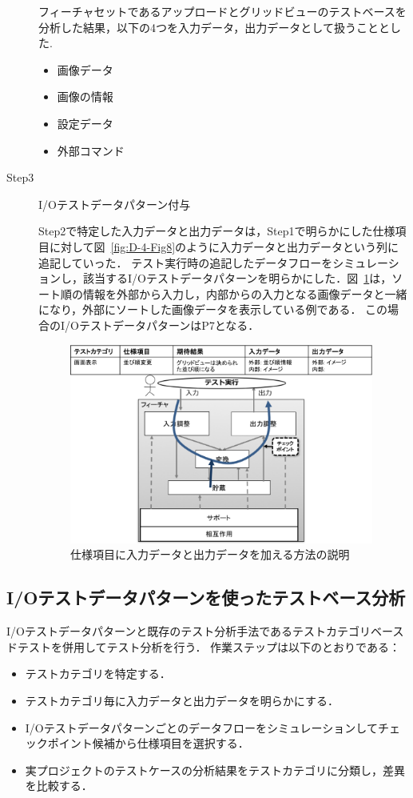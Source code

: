 \begin{description}
フィーチャセットであるアップロードとグリッドビューのテストベースを分析した結果，以下の4つを入力データ，出力データとして扱うこととした.
\begin{itemize}
 \item 画像データ
 \item 画像の情報
 \item 設定データ
　\item 外部コマンド
\end{itemize}

\item[Step3] I/Oテストデータパターン付与

Step2で特定した入力データと出力データは，Step1で明らかにした仕様項目に対して図~\ref{fig:D-4-Fig8}のように入力データと出力データという列に追記していった．
テスト実行時の追記したデータフローをシミュレーションし，該当するI/Oテストデータパターンを明らかにした．図~\ref{fig:D-4-Fig9}は，ソート順の情報を外部から入力し，内部からの入力となる画像データと一緒になり，外部にソートした画像データを表示している例である．
この場合のI/OテストデータパターンはP7となる．

\begin{figure}[htbp]
\begin{center}
\includegraphics[width=10cm]{./image/D-4-Fig9.png}
\caption{仕様項目に入力データと出力データを加える方法の説明}
\label{fig:D-4-Fig9}
\end{center}
\end{figure}

\end{description}

\subsection{I/Oテストデータパターンを使ったテストベース分析}
I/Oテストデータパターンと既存のテスト分析手法であるテストカテゴリベースドテストを併用してテスト分析を行う．
作業ステップは以下のとおりである：
\begin{itemize}
 \item テストカテゴリを特定する．
 \item テストカテゴリ毎に入力データと出力データを明らかにする．
 \item I/Oテストデータパターンごとのデータフローをシミュレーションしてチェックポイント候補から仕様項目を選択する．
　\item 実プロジェクトのテストケースの分析結果をテストカテゴリに分類し，差異を比較する．
\end{itemize}

